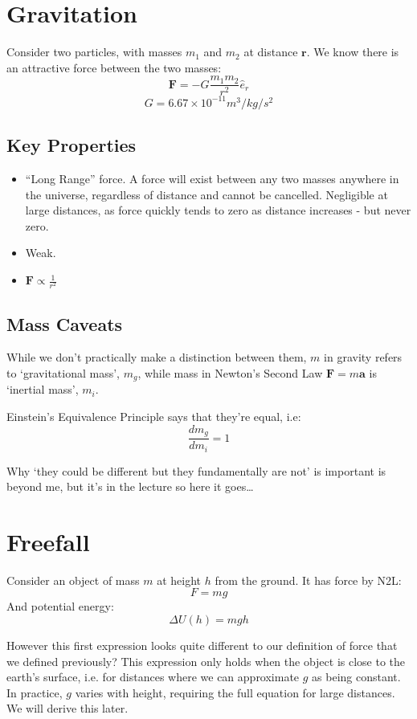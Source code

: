 \section{Gravitation}
Consider two particles, with masses $m_1$ and $m_2$ at distance $\pmb{r}$. We know there is an attractive force between the two masses:
\begin{equation}
    \pmb{F} = -G \frac{m_1 m_2}{r^2} \hat{e}_r
\end{equation}
\[
    G = 6.67 \times 10^{-11} m^3/kg/s^2
\]

\subsection{Key Properties}
\begin{itemize}
    \item ``Long Range'' force. A force will exist between any two masses anywhere in the universe, regardless of distance and cannot be cancelled. Negligible at large distances, as force quickly tends to zero as distance increases - but never zero.
    \item Weak.
    \item $\pmb{F} \propto \frac{1}{r^2}$
\end{itemize}

\subsection{Mass Caveats}
While we don't practically make a distinction between them, $m$ in gravity refers to `gravitational mass', $m_g$, while mass in Newton's Second Law $\pmb{F} = m \pmb{a}$ is `inertial mass', $m_i$.

Einstein's Equivalence Principle says that they're equal, i.e:
\[
    \frac{dm_g}{dm_i} = 1
\]

Why `they could be different but they fundamentally are not' is important is beyond me, but it's in the lecture so here it goes\ldots

\section{Freefall}
Consider an object of mass $m$ at height $h$ from the ground. It has force by N2L:
\[
    F = mg
\]
And potential energy:
\[
    \Delta U(h) = mgh
\]

However this first expression looks quite different to our definition of force that we defined previously? This expression only holds when the object is close to the earth's surface, i.e. for distances where we can approximate $g$ as being constant. In practice, $g$ varies with height, requiring the full equation for large distances. We will derive this later.

